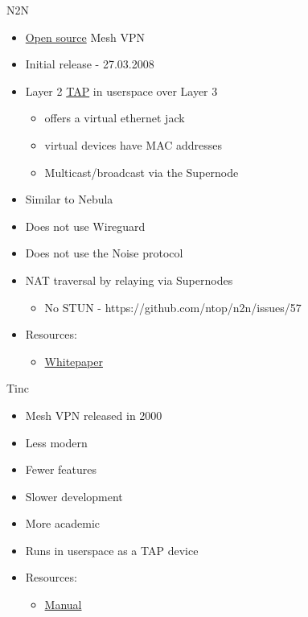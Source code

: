 \label{notes__02056-n2n.md}
\begin{block}{N2N}
\label{notes__02056-n2n.md__n2n}
\begin{itemize}
\tightlist
\item
  \href{https://github.com/ntop/n2n}{Open source} Mesh VPN
\item
  Initial release - 27.03.2008
\item
  Layer 2 \href{notes/02021-internet-protocol}{TAP} in userspace over Layer 3

  \begin{itemize}
  \tightlist
  \item
    offers a virtual ethernet jack
  \item
    virtual devices have MAC addresses
  \item
    Multicast/broadcast via the Supernode
  \end{itemize}
\item
  Similar to Nebula
\item
  Does not use Wireguard
\item
  Does not use the Noise protocol
\item
  NAT traversal by relaying via Supernodes

  \begin{itemize}
  \tightlist
  \item
    No STUN - https://github.com/ntop/n2n/issues/57
  \end{itemize}
\item
  Resources:

  \begin{itemize}
  \tightlist
  \item
    \href{http://luca.ntop.org/n2n.pdf}{Whitepaper}
  \end{itemize}
\end{itemize}
\end{block}

\label{notes__02058-tinc.md}
\begin{block}{Tinc}
\label{notes__02058-tinc.md__tinc}
\begin{itemize}
\tightlist
\item
  Mesh VPN released in 2000
\item
  Less modern
\item
  Fewer features
\item
  Slower development
\item
  More academic
\item
  Runs in userspace as a TAP device
\item
  Resources:

  \begin{itemize}
  \tightlist
  \item
    \href{https://www.tinc-vpn.org/documentation-1.1/tinc.pdf}{Manual}
  \end{itemize}
\end{itemize}
\end{block}

